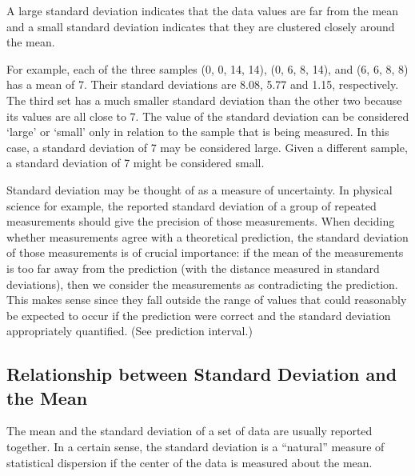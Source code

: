 A large standard deviation indicates that the data values are far from the mean and a small standard deviation indicates that they are clustered closely around the mean.

For example, each of the three samples (0, 0, 14, 14), (0, 6, 8, 14), and (6, 6, 8, 8) has a mean of 7. Their standard deviations are 8.08, 5.77 and 1.15, respectively. The third set has a much smaller standard deviation than the other two because its values are all close to 7. The value of the standard deviation can be considered `large' or `small' only in relation to the sample that is being measured. In this case, a standard deviation of 7 may be considered large. Given a different sample, a standard deviation of 7 might be considered small.

Standard deviation may be thought of as a measure of uncertainty. In physical science for example, the reported standard deviation of a group of repeated measurements should give the precision of those measurements. When deciding whether measurements agree with a theoretical prediction, the standard deviation of those measurements is of crucial importance: if the mean of the measurements is too far away from the prediction (with the distance measured in standard deviations), then we consider the measurements as contradicting the prediction. This makes sense since they fall outside the range of values that could reasonably be expected to occur if the prediction were correct and the standard deviation appropriately quantified. (See prediction interval.)

\subsection{Relationship between Standard Deviation and the Mean}

The mean and the standard deviation of a set of data are usually reported together. In a certain sense, the standard deviation is a ``natural'' measure of statistical dispersion if the center of the data is measured about the mean. 


